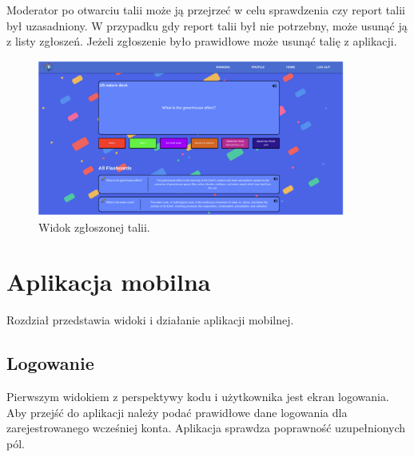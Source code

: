 Moderator po otwarciu talii może ją przejrzeć w celu sprawdzenia czy report talii był uzasadniony. W przypadku gdy report talii był nie potrzebny, może usunąć ją z listy zgłoszeń. Jeżeli zgłoszenie było prawidłowe może usunąć talię z aplikacji.


\begin{figure}[H]
    \centering
    \includegraphics[width=0.9\textwidth]{chapters/chapter_10/images_web/web_reported_deck_2}
    \caption{Widok zgłoszonej talii.}
    \label{img:web_reported_deck_2}
\end{figure}

\newpage
\section{Aplikacja mobilna}
Rozdział przedstawia widoki i działanie aplikacji mobilnej. 


\subsection{Logowanie}
Pierwszym widokiem z perspektywy kodu i użytkownika jest ekran logowania. Aby przejść do aplikacji należy podać prawidłowe dane logowania dla zarejestrowanego wcześniej konta. Aplikacja sprawdza poprawność uzupełnionych pól.


